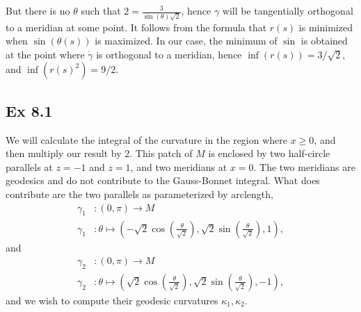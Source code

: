 \documentclass{article}
\theoremstyle{definition}
\begin{document}
But there is no $\theta$ such that $2 = \frac{3}{\sin(\theta)\sqrt{2}}$, hence
$\gamma$ will be tangentially orthogonal to a meridian at some point. It
follows from the formula that $r(s)$ is minimized when $\sin(\theta(s))$ is
maximized. In our case, the minimum of $\sin$ is obtained at the point where
$\dot\gamma$ is orthogonal to a meridian, hence $\inf(r(s)) = 3/\sqrt{2}$, and
$\inf(r(s)^2) = 9/2$.


\subsection*{Ex 8.1}

We will calculate the integral of the curvature in the region where $x \geq 0$,
and then multiply our result by $2$. This patch of $M$ is enclosed by two
half-circle parallels at $z = -1$ and $z = 1$, and two meridians at $x = 0$.
The two meridians are geodesics and do not contribute to the Gauss-Bonnet
integral. What does contribute are the two parallels as parameterized by arclength, 
\begin{align*}
	\gamma_1 
	&: 
	(0, \pi)  
	\to 
	M \\
	\gamma_1 
	&: 
	\theta 
	\mapsto 
	\left(
		-\sqrt{2}\cos\left(\frac{\theta}{\sqrt{2}}\right), 
		\sqrt{2}\sin\left(\frac{\theta}{\sqrt{2}}\right), 
		1
	\right),
\end{align*} 
and
\begin{align*}
	\gamma_2 
	&: 
	(0, \pi)  
	\to 
	M \\
	\gamma_2 
	&: 
	\theta 
	\mapsto 
	\left(
		\sqrt{2}\cos\left(\frac{\theta}{\sqrt{2}}\right), 
		\sqrt{2}\sin\left(\frac{\theta}{\sqrt{2}}\right), 
		-1
	\right),
\end{align*}
and we wish to compute their geodesic curvatures $\kappa_1, \kappa_2$. \\
\end{document}
